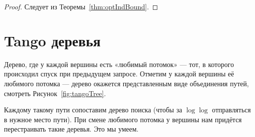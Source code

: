 \begin{proof}
Следует из Теоремы~\ref{thm:optIndBound}.
\end{proof}



\section{Tango деревья} 

Дерево, где у каждой вершины есть «любимый потомок» — тот, в которого происходил спуск при предыдущем запросе. Отметим у каждой вершины её любимого потомка — дерево окажется представленным виде объединения путей, смотреть Рисунок~\ref{fig:tangoTree}.



Каждому такому пути сопоставим дерево поиска (чтобы за $\log \log$ отправляться в нужное место пути). При смене любимого потомка у вершины нам придётся перестраивать такие деревья. Это мы умеем.